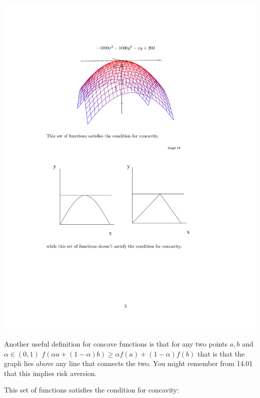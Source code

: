 \documentclass[11pt,english]{article}
\begin{document}
\begin{center}
\includegraphics[scale=0.8]{math4.pdf}

Another useful definition for concave functions is that for any two points $a,b$ and $\alpha\in(0,1)$ $f(\alpha a+(1-\alpha)b)\geq \alpha f(a)+(1-\alpha)f(b)$ that is that the graph lies above any line that connects the two. You might remember from 14.01 that this implies risk aversion.


\end{center}


This set of functions satisfies the condition for concavity:
\end{document}
